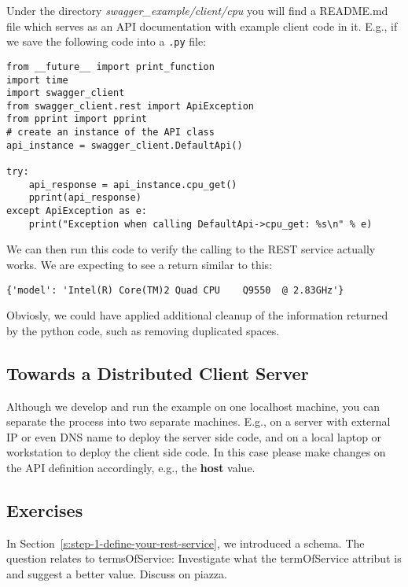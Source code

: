 Under the directory \emph{swagger\_example/client/cpu} you will find a
README.md file which serves as an API documentation with example client
code in it. E.g., if we save the following code into a \verb|.py| file:

\begin{lstlisting}
from __future__ import print_function
import time
import swagger_client
from swagger_client.rest import ApiException
from pprint import pprint
# create an instance of the API class
api_instance = swagger_client.DefaultApi()

try:
    api_response = api_instance.cpu_get()
    pprint(api_response)
except ApiException as e:
    print("Exception when calling DefaultApi->cpu_get: %s\n" % e)
\end{lstlisting}

We can then run this code to verify the calling to the REST service
actually works. We are expecting to see a return similar to this:

\begin{lstlisting}
{'model': 'Intel(R) Core(TM)2 Quad CPU    Q9550  @ 2.83GHz'}
\end{lstlisting}

Obviosly, we could have applied additional cleanup of the information
returned by the python code, such as removing duplicated spaces.

\subsection{Towards a Distributed Client
Server}\label{towards-a-distributed-client-server}

Although we develop and run the example on one localhost machine, you
can separate the process into two separate machines. E.g., on a server
with external IP or even DNS name to deploy the server side code, and on
a local laptop or workstation to deploy the client side code. In this
case please make changes on the API definition accordingly, e.g., the
\textbf{host} value.

\subsection{Exercises}\label{s:swagger-exercises}

\begin{exercise}
  In Section~\ref{s:step-1-define-your-rest-service}, we introduced a
  schema. The question relates to termsOfService: Investigate what the
  termOfService attribut is and suggest a better value. Discuss on
  piazza.
\end{exercise}

